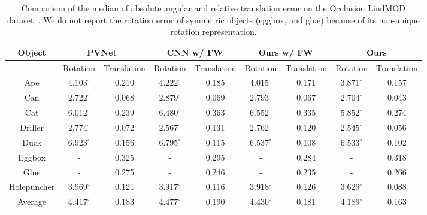 \documentclass[10pt,twocolumn,letterpaper]{article}
\begin{document}
\begin{table*}
\caption{Comparison of the median of absolute angular and relative translation error on the Occlusion LindMOD dataset~\cite{10.1007/978-3-319-10605-2_35}. We do not report the rotation error of symmetric objects (eggbox, and glue) because of its non-unique rotation representation.}
\centering
\vspace*{1mm}
\begin{tabular}{c||cc|cc|cc|cc}
  \hline
  {Object}
             & \multicolumn{2}{c|}{PVNet~\cite{peng2019pvnet}} &
               \multicolumn{2}{c|}{CNN w/ FW} &
               \multicolumn{2}{c|}{Ours w/ FW} &
               \multicolumn{2}{c}{Ours} \\ \hline
  & Rotation & Translation & Rotation & Translation & Rotation & Translation & Rotation & Translation\\ \hline
  Ape        & $4.103^{\circ}$ & 0.210 & $4.222^{\circ}$ & 0.185 & $4.015^{\circ}$ & 0.171 & $3.871^{\circ}$ & 0.157 \\
  Can        & $2.722^{\circ}$ & 0.068 & $2.879^{\circ}$ & 0.069 & $2.793^{\circ}$ & 0.067 & $2.704^{\circ}$ & 0.043 \\
  Cat        & $6.012^{\circ}$ & 0.239 & $6.480^{\circ}$ & 0.363 & $6.552^{\circ}$ & 0.335 & $5.852^{\circ}$ & 0.274 \\
  Driller    & $2.774^{\circ}$ & 0.072 & $2.567^{\circ}$ & 0.131 & $2.762^{\circ}$ & 0.120 & $2.545^{\circ}$ & 0.056 \\
  Duck       & $6.923^{\circ}$ & 0.156 & $6.795^{\circ}$ & 0.115 & $6.537^{\circ}$ & 0.108 & $6.533^{\circ}$ & 0.102 \\
  Eggbox     & -               & 0.325 & -               & 0.295 & -               & 0.284 & -               & 0.318 \\
  Glue       & -               & 0.275 & -               & 0.246 & -               & 0.235 & -               & 0.266 \\
  Holepuncher& $3.969^{\circ}$ & 0.121 & $3.917^{\circ}$ & 0.116 & $3.918^{\circ}$ & 0.126 & $3.629^{\circ}$ & 0.088 \\ \hline
  Average    & $4.417^{\circ}$ & 0.183 & $4.477^{\circ}$ & 0.190 & $4.430^{\circ}$ & 0.181 & $4.189^{\circ}$ & 0.163 \\ \hline
\end{tabular}
\label{tab:rot_trans_ablation_occ}
\end{table*}
\end{document}
